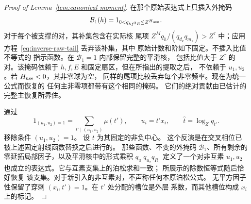 \documentclass[11pt,a4paper]{article}
\numberwithin{equation}{section}
\numberwithin{figure}{section}
\theoremstyle{definition}
\theoremstyle{remark}
\begin{document}
\begin{proof}[Proof of Lemma~\ref{lem:canonical-moment}]
在那个原始表达式上只插入外掩码
\[
 \mathcal B_1(h)=1_{0<q_{hf^2E}\le Z^{H_{\rm use}}}.
\]
对于每个被支撑的对，其补集包含在实际核
尾项 \(Z^Mq_h/(q_{d_k}q_{m_1})>Z^\tau\) 中；应用
方程~\eqref{eq:inverse-raw-tail} 丢弃该补集，其中
原始计数和阶如下固定。不插入比值不等式的
指示函数。在 \(\mathcal B_1=1\) 内部保留完整的平滑核，
包括比值大于 \(Z^\tau\) 的对。该掩码依赖于
\(h,f,E\) 和固定扇区，但在所指出的提取之后，
不依赖于 \(u_1,u_2\)。若 \(H_{\rm use}<0\)，其非零球为空，
同样的尾项比较丢弃每个非零频率。现在为统一公式而恢复的
任何主非零项都带有这个相同的掩码。
它们的绝对贡献由已估计的完整主恢复所界住。

通过
\[
 1_{(u_1,u_2)=1}=\sum_{t'\mid(u_1,u_2)}\mu(t'),\qquad u_i=t'x_i,
 \qquad \widehat t=\log_Zq_{t'}.
\]
移除条件 \((u_1,u_2)=1\)。
设 \(t\) 为其固定的非负中心。
这个反演是在交叉相位已被上述固定射线函数替换之后进行的。
那些函数、不变的外掩码 \(\mathcal B_1\)、所有剩余的
零延拓局部因子，以及平滑核中的形式乘积
\(q_{u_1}q_{u_2}q_{R_1}\) 定义了一个对非互素
\(u_1,u_2\) 也成立的表达式。它与互素支集上的泊松求和一致；
所展示的除数恒等式随后恰好恢复
该支集。对于新引入的非互素对，不声称任何本原泊松公式。
无平方因子性保留了穿刺 \((x_i,t')=1\)。在 \(t'\) 处分配的槽位是外层
系数，而其他槽位构成 \(x_i\) 上的标记。


\end{proof}
\end{document}
